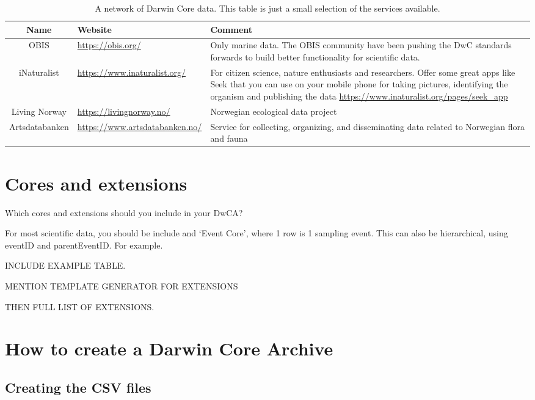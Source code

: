 \documentclass[a4paper,english, 11pt]{article}
\begin{document}
\begin{table}[h!]
\centering
\caption{A network of Darwin Core data. This table is just a small selection of the services available.}
\begin{tabular}{cp{6cm}p{6.5cm}}
\toprule
Name & Website       & Comment  \\
\midrule
OBIS       & \url{https://obis.org/} & Only marine data. The OBIS community have been pushing the DwC standards forwards to build better functionality for scientific data.      \\
iNaturalist       & \url{https://www.inaturalist.org/} & For citizen science, nature enthusiasts and researchers. Offer some great apps like Seek that you can use on your mobile phone for taking pictures, identifying the organism and publishing the data \url{https://www.inaturalist.org/pages/seek_app}     \\
Living Norway     & \url{https://livingnorway.no/} & Norwegian ecological data project     \\
Artsdatabanken  & \url{https://www.artsdatabanken.no/} &  Service for collecting, organizing, and disseminating data related to Norwegian flora and fauna \\
\bottomrule
\end{tabular}
\end{table} 

\section{Cores and extensions}
\label{s:cores and extensions}

Which cores and extensions should you include in your DwCA? 

For most scientific data, you should be include and `Event Core', where 1 row is 1 sampling event. This can also be hierarchical, using eventID and parentEventID. For example.

INCLUDE EXAMPLE TABLE.

MENTION TEMPLATE GENERATOR FOR EXTENSIONS

THEN FULL LIST OF EXTENSIONS.

\section{How to create a Darwin Core Archive}
\label{s:how}



\subsection{Creating the CSV files}
\label{ss:CSVs}
\end{document}
